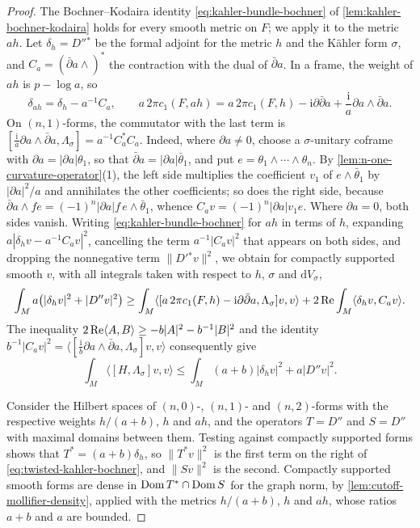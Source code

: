 \begin{proof}
The Bochner--Kodaira identity \eqref{eq:kahler-bundle-bochner} of \cref{lem:kahler-bochner-kodaira} holds for every smooth metric on $F$; we apply it to the metric $ah$. Let $\delta_h=D''{}^*$ be the formal adjoint for the metric $h$ and the K\"ahler form $\sigma$, and $C_a=(\bar\partial a\wedge)^*$ the contraction with the dual of $\bar\partial a$. In a frame, the weight of $ah$ is $p-\log a$, so
\[
 \delta_{ah}=\delta_h-a^{-1}C_a,\qquad
 a\,2\pi c_1(F,ah)=a\,2\pi c_1(F,h)
            -\mathrm i\partial\bar\partial a
            +\frac{\mathrm i}{a}\partial a\wedge\bar\partial a.
\]
On $(n,1)$-forms, the commutator with the last term is $[\frac{\mathrm i}{a}\partial a\wedge\bar\partial a,\Lambda_\sigma]=a^{-1}C_a^*C_a$. Indeed, where $\partial a\neq0$, choose a $\sigma$-unitary coframe with $\partial a=|\partial a|\theta_1$, so that $\bar\partial a=|\partial a|\bar\theta_1$, and put $e=\theta_1\wedge\cdots\wedge\theta_n$. By \cref{lem:n-one-curvature-operator}(1), the left side multiplies the coefficient $v_1$ of $e\wedge\bar\theta_1$ by $|\partial a|^2/a$ and annihilates the other coefficients; so does the right side, because $\bar\partial a\wedge fe=(-1)^n|\partial a|f\,e\wedge\bar\theta_1$, whence $C_av=(-1)^n|\partial a|v_1e$. Where $\partial a=0$, both sides vanish. Writing \eqref{eq:kahler-bundle-bochner} for $ah$ in terms of $h$, expanding $a|\delta_hv-a^{-1}C_av|^2$, cancelling the term $a^{-1}|C_av|^2$ that appears on both sides, and dropping the nonnegative term $\|D'{}^*v\|^2$, we obtain for compactly supported smooth $v$, with all integrals taken with respect to $h$, $\sigma$ and $\mathrm dV_\sigma$,
\[
 \int_M a\bigl(|\delta_hv|^2+|D''v|^2\bigr)
 \geq\int_M\langle[a\,2\pi c_1(F,h)
                      -\mathrm i\partial\bar\partial a,\Lambda_\sigma]v,v\rangle
            +2\operatorname{Re}\int_M\langle\delta_hv,C_av\rangle.
\]
The inequality $2\operatorname{Re}\langle A,B\rangle\geq-b|A|^2-b^{-1}|B|^2$ and the identity $b^{-1}|C_av|^2=\langle[\frac{\mathrm i}{b}\partial a\wedge\bar\partial a,\Lambda_\sigma]v,v\rangle$ consequently give
\begin{equation}\label{eq:twisted-kahler-bochner}
 \int_M\langle[H,\Lambda_\sigma]v,v\rangle
       \leq\int_M(a+b)|\delta_hv|^2+a|D''v|^2.
\end{equation}

Consider the Hilbert spaces of $(n,0)$-, $(n,1)$- and $(n,2)$-forms with the respective weights $h/(a+b)$, $h$ and $ah$, and the operators $T=D''$ and $S=D''$ with maximal domains between them. Testing against compactly supported forms shows that $T^*=(a+b)\delta_h$, so $\|T^*v\|^2$ is the first term on the right of \eqref{eq:twisted-kahler-bochner}, and $\|Sv\|^2$ is the second. Compactly supported smooth forms are dense in $\operatorname{Dom} T^*\cap\operatorname{Dom} S$ for the graph norm, by \cref{lem:cutoff-mollifier-density}, applied with the metrics $h/(a+b)$, $h$ and $ah$, whose ratios $a+b$ and $a$ are bounded.


\end{proof}
